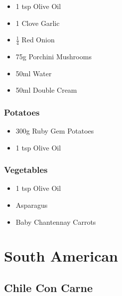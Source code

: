 \documentclass[11pt, english]{article}
\begin{document}
	\begin{itemize}
        \setlength\itemsep{0cm}
                \item 1 tsp Olive Oil
		\item 1 Clove Garlic
		\item $\frac{1}{4}$ Red Onion
		\item 75g Porchini Mushrooms
		\item 50ml Water
		\item 50ml Double Cream
        \end{itemize}

		\subsubsection*{Potatoes}

        \begin{itemize}
        \setlength\itemsep{0cm}
                \item 300g Ruby Gem Potatoes
		\item 1 tsp Olive Oil
        \end{itemize}

		\subsubsection*{Vegetables}

	\begin{itemize}
        \setlength\itemsep{0cm}
		\item 1 tsp Olive Oil
                \item Asparagus
		\item Baby Chantennay Carrots
        \end{itemize}

\newpage

\section{South American}

	\subsection{Chile Con Carne}
\end{document}
